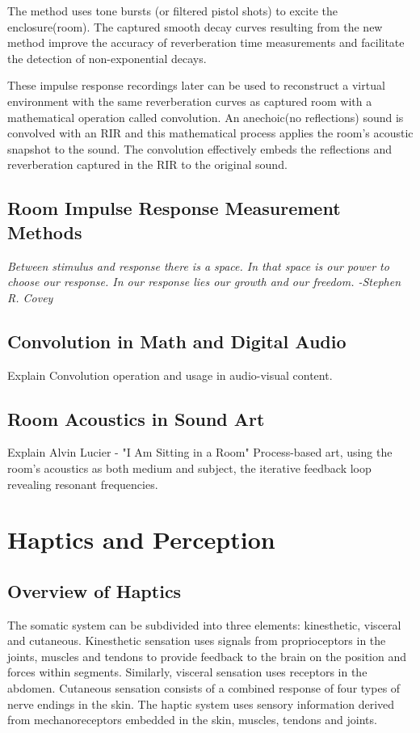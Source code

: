             The method uses tone bursts (or filtered pistol shots) to excite the enclosure(room). The captured smooth decay curves resulting from the new method improve the accuracy of reverberation time measurements and facilitate the detection of non-exponential decays\cite{New_Method_Measuring_RT}.\par

            These impulse response recordings later can be used to reconstruct a virtual environment with the same reverberation curves as captured room with a mathematical operation called convolution. An anechoic(no reflections) sound is convolved with an RIR and this mathematical process applies the room's acoustic snapshot to the sound. The convolution effectively embeds the reflections and reverberation captured in the RIR to the original sound.
        \subsection{Room Impulse Response Measurement Methods}
        \emph{Between stimulus and response there is a space. In that space is our power to choose our response. In our response lies our growth and our freedom. -Stephen R. Covey\cite{Sonic_Interaction_in_Virtual_Environments}}
        \subsection{Convolution in Math and Digital Audio} Explain Convolution operation and usage in audio-visual content.
        \subsection{Room Acoustics in Sound Art} Explain Alvin Lucier - "I Am Sitting in a Room" Process-based art, using the room's acoustics as both medium and subject, the iterative feedback loop revealing resonant frequencies.
    \section{Haptics and Perception}
        \subsection{Overview of Haptics}
            The somatic system can be subdivided into three elements: kinesthetic, visceral and cutaneous. Kinesthetic sensation uses signals from proprioceptors in the joints, muscles and tendons to provide feedback to the brain on the position and forces within segments. Similarly, visceral sensation uses receptors in the abdomen. Cutaneous sensation consists of a combined response of four types of nerve endings in the skin\cite{Blank}. The haptic system uses sensory information derived from mechanoreceptors embedded in the skin, muscles, tendons and joints\cite{Blank}.\par

